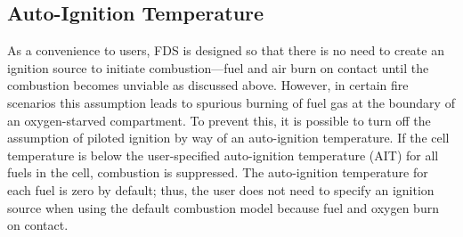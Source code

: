 \subsection{Auto-Ignition Temperature}

As a convenience to users, FDS is designed so that there is no need to create an ignition source to initiate combustion---fuel and air burn on contact until the combustion becomes unviable as discussed above. However, in certain fire scenarios this assumption leads to spurious burning of fuel gas at the boundary of an oxygen-starved compartment. To prevent this, it is possible to turn off the assumption of piloted ignition by way of an auto-ignition temperature. If the cell temperature is below the user-specified auto-ignition temperature (AIT) for all fuels in the cell, combustion is suppressed. The auto-ignition temperature for each fuel is zero by default; thus, the user does not need to specify an ignition source when using the default combustion model because fuel and oxygen burn on contact.
